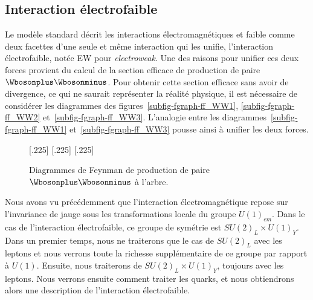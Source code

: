 \subsection{Interaction électrofaible}\label{chapter-MS-MSSM-section-formalisme-subsec-EW}
Le modèle standard décrit les interactions électromagnétiques et faible comme deux facettes d'une seule et même interaction qui les unifie, l'interaction électrofaible, notée \og EW \fg{} pour \emph{electroweak}.
Une des raisons pour unifier ces deux forces provient du calcul de la section efficace de production de paire $\Wbosonplus\Wbosonminus$. Pour obtenir cette section efficace sans avoir de divergence, ce qui ne saurait représenter la réalité physique, il est nécessaire de considérer les diagrammes des figures~\ref{subfig-fgraph-ff_WW1}, \ref{subfig-fgraph-ff_WW2} et~\ref{subfig-fgraph-ff_WW3}. L'analogie entre les diagrammes~\ref{subfig-fgraph-ff_WW1} et~\ref{subfig-fgraph-ff_WW3} pousse ainsi à unifier les deux forces.
\begin{figure}[h]
\centering
\vspace{\baselineskip}
\subcaptionbox{\label{subfig-fgraph-ff_WW1}}[.225\textwidth]
{\vspace{\baselineskip}}
\hfill
\subcaptionbox{\label{subfig-fgraph-ff_WW2}}[.225\textwidth]
{\vspace{\baselineskip}}
\hfill
\subcaptionbox{\label{subfig-fgraph-ff_WW3}}[.225\textwidth]
{\vspace{\baselineskip}}

\caption{Diagrammes de Feynman de production de paire $\Wbosonplus\Wbosonminus$ à l'arbre.}
\label{fig-fgraph-ff_WW}
\end{figure}
\par Nous avons vu précédemment que l'interaction électromagnétique repose sur l'invariance de jauge sous les transformations locale du groupe $U(1)_{em}$.
Dans le cas de l'interaction électrofaible, ce groupe de symétrie est $SU(2)_L \times U(1)_Y$. Dans un premier temps, nous ne traiterons que le cas de $SU(2)_L$ avec les leptons et nous verrons toute la richesse supplémentaire de ce groupe par rapport à $U(1)$. Ensuite, nous traiterons de $SU(2)_L \times U(1)_Y$, toujours avec les leptons. Nous verrons ensuite comment traiter les quarks, et nous obtiendrons alors une description de l'interaction électrofaible.
